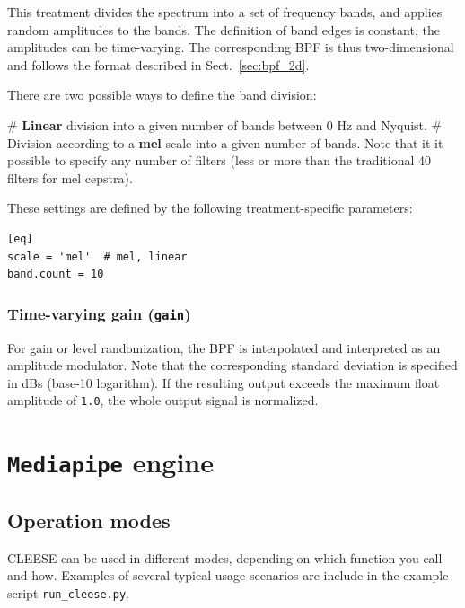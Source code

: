 \documentclass[oneside,10pt]{article}
\newcommand{\mic}{\texttt}
\begin{document}
This treatment divides the spectrum into a set of frequency bands, and applies
random amplitudes to the bands. The definition of band edges is constant, the
amplitudes can be time-varying. The corresponding BPF is thus two-dimensional
and follows the format described in Sect.~\ref{sec:bpf_2d}.

There are two possible ways to define the band division:

\vspace{5pt}
\begin{easylist}[itemize]
# \textbf{Linear} division into a given number of bands between 0 Hz and Nyquist.
# Division according to a \textbf{mel} scale into a given number of bands. Note
        that it it possible to specify any number of filters (less or more than
        the traditional 40 filters for mel cepstra).
\end{easylist}
\vspace{8pt}

These settings are defined by the following treatment-specific parameters:

\vspace{5pt}
\begin{verbatim}
[eq]
scale = 'mel'  # mel, linear
band.count = 10
\end{verbatim}

\subsubsection{Time-varying gain (\texttt{gain})}

For gain or level randomization, the BPF is interpolated and interpreted as an
amplitude modulator. Note that the corresponding standard deviation is
specified in dBs (base-10 logarithm). If the resulting output exceeds the
maximum float amplitude of \mic{1.0}, the whole output signal is normalized.


\section{\texttt{Mediapipe} engine}
\subsection{Operation modes}

CLEESE can be used in different modes, depending on which function you call and
how. Examples of several typical usage scenarios are include in the example
script \texttt{run\_cleese.py}.
\end{document}
